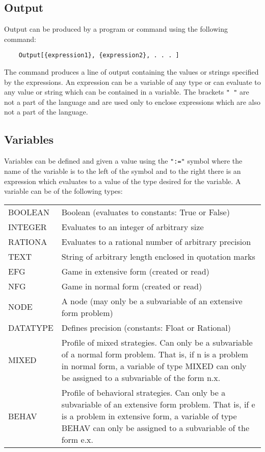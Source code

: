 \subsection*{Output}

Output can be produced by a program or command using the following command:

\begin{verbatim}
	Output[{expression1}, {expression2}, . . . ]
\end{verbatim}

The command produces a line of output containing the values or strings 
specified by the expressions.  An expression can be a variable of any type or 
can evaluate to any value or string which can be contained in a variable.  The 
brackets {\tt "{ }"} are not a part of the language and are used only to 
enclose expressions which are also not a part of the language.

\subsection*{Variables}

Variables can be defined and given a value using the {\tt ":="} symbol 
where the name of the variable is to the left of the symbol and to the right 
there is an expression which evaluates to a value of the type desired for 
the variable. A variable can be of the following types:

\medskip

\begin{tabular}{lp{4in}}
BOOLEAN & Boolean (evaluates to constants:  True or False)\\
INTEGER & Evaluates to an integer of arbitrary size \\
RATIONA & Evaluates to a rational number of arbitrary precision\\
TEXT	& String of arbitrary length enclosed in quotation marks\\
EFG	& Game in extensive form (created or read)\\
NFG	& Game in normal form (created or read)\\
NODE	& A node (may only be a subvariable of an extensive form
problem) \\
DATATYPE & Defines precision (constants:  Float or Rational) \\
MIXED	& {Profile of mixed strategies.  Can only be a subvariable of a
normal form problem.  That is, if n is a problem in normal form, a
variable of type MIXED can only be assigned to a subvariable of the
form n.x.}\\
BEHAV	& Profile of behavioral strategies.  Can only be a subvariable
of an extensive form problem.  That is, if e is a problem in extensive
form, a variable of type BEHAV can only be assigned to a subvariable
of the form e.x. \\
\end{tabular}

